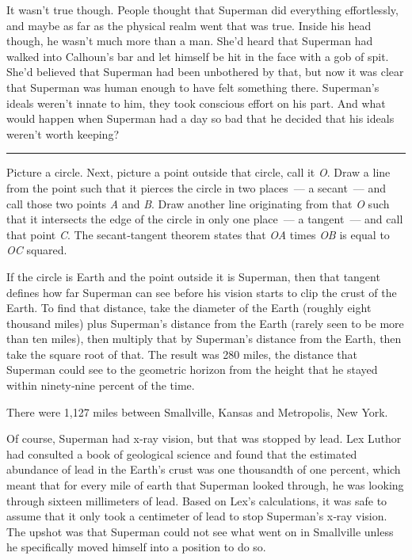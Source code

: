 It wasn't true though. People thought that Superman did everything
effortlessly, and maybe as far as the physical realm went that was true.
Inside his head though, he wasn't much more than a man. She'd heard that
Superman had walked into Calhoun's bar and let himself be hit in the
face with a gob of spit. She'd believed that Superman had been
unbothered by that, but now it was clear that Superman was human enough
to have felt something there. Superman's ideals weren't innate to him,
they took conscious effort on his part. And what would happen when
Superman had a day so bad that he decided that his ideals weren't worth
keeping?

\begin{center}\rule{0.5\linewidth}{\linethickness}\end{center}

Picture a circle. Next, picture a point outside that circle, call it
\emph{O}. Draw a line from the point such that it pierces the circle in
two places~--- a secant~--- and call those two points \emph{A} and
\emph{B}. Draw another line originating from that \emph{O} such that it
intersects the edge of the circle in only one place~--- a tangent~---
and call that point \emph{C}. The secant‐tangent theorem states that
\emph{OA} times \emph{OB} is equal to \emph{OC} squared.

If the circle is Earth and the point outside it is Superman, then that
tangent defines how far Superman can see before his vision starts to
clip the crust of the Earth. To find that distance, take the diameter of
the Earth (roughly eight thousand miles) plus Superman's distance from
the Earth (rarely seen to be more than ten miles), then multiply that by
Superman's distance from the Earth, then take the square root of that.
The result was 280 miles, the distance that Superman could see to the
geometric horizon from the height that he stayed within ninety‐nine
percent of the time.

There were 1,127 miles between Smallville, Kansas and Metropolis, New
York.

Of course, Superman had x‐ray vision, but that was stopped by lead. Lex
Luthor had consulted a book of geological science and found that the
estimated abundance of lead in the Earth's crust was one thousandth of
one percent, which meant that for every mile of earth that Superman
looked through, he was looking through sixteen millimeters of lead.
Based on Lex's calculations, it was safe to assume that it only took a
centimeter of lead to stop Superman's x‐ray vision. The upshot was that
Superman could not see what went on in Smallville unless he specifically
moved himself into a position to do so.

